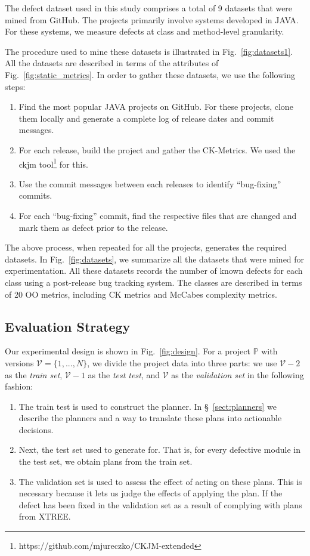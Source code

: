 \documentclass[sigconf, proceedings, 9pt]{acmart}
\newcommand{\be}{\begin{enumerate}}
\newcommand{\ee}{\end{enumerate}}
\newcommand{\tion}[1]{\S~\ref{sect:#1}}
\newcommand{\fig}[1]{Fig.~\ref{fig:#1}}
\begin{document}
The defect dataset used in this study comprises a total of 9 datasets that were 
mined from GitHub. The projects primarily involve systems developed in JAVA. 
For these systems, we measure defects at class and method-level granularity. 

The procedure used to mine these datasets is illustrated in 
\fig{datasets1}. All the datasets are 
described in terms of the attributes of \fig{static_metrics}. In order to 
gather these datasets, we use the following steps:
\be
\item Find the most popular JAVA projects on GitHub. For these projects, clone 
them locally and generate a complete log of release dates and commit messages.
\item For each release, build the project and gather the CK-Metrics. We used 
the ckjm tool\footnote{https://github.com/mjureczko/CKJM-extended} for this.
\item Use the commit messages between each releases to identify ``bug-fixing'' 
commits.
\item For each ``bug-fixing'' commit, find the respective files that are 
changed and mark them as defect prior to the release.
\ee

The above process, when repeated for all the projects, generates the required 
datasets. In \fig{datasets}, we summarize all the datasets that were mined for 
experimentation. All these datasets records the number of known defects 
for each class using a post-release bug tracking system. The classes are 
described in terms of 20 OO metrics, including CK metrics and McCabes 
complexity metrics. 


\subsection{Evaluation Strategy}
\label{sect:procedure}


Our experimental design is shown in \fig{design}. For a project $\mathbb{P}$ 
with versions $\mathcal{V}=\{1, ..., N\}$, we divide the
project data  into three parts: we use $\mathcal{V}-2$ as the \textit{train 
set}, $\mathcal{V}-1$ as the \textit{test test}, and $\mathcal{V}$ as the
\textit{validation set} in the following fashion:

\be
\item The train test is used to construct the planner. In \tion{planners} we 
describe the planners and a way to translate these plans 
into actionable decisions. 
\item Next, the test set used to generate for. That is, for every defective 
module in the test set, we obtain plans from the train set.
\item The validation set is used to assess the effect of acting on these plans. 
This is necessary because it lets us judge the  effects of applying the plan. 
If the defect has been fixed in the validation set as a result of complying 
with plans from XTREE.
\ee
\end{document}
